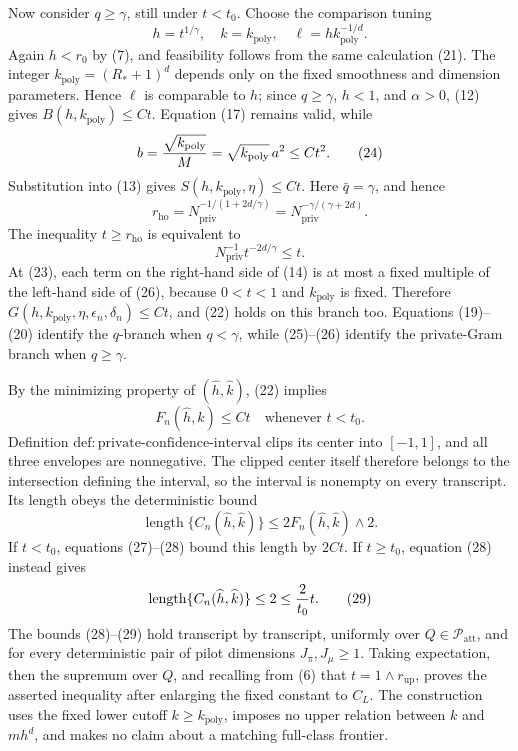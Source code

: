 Now consider \(q\ge\gamma\), still under \(t<t_0\).  Choose the comparison tuning
\[
 h=t^{1/\gamma},\quad k=k_{\mathrm{poly}},
 \quad \ell=hk_{\mathrm{poly}}^{-1/d}.
\tag{23}
\]
Again \(h<r_0\) by (7), and feasibility follows from the same calculation (21).  The integer \(k_{\mathrm{poly}}=(R_*+1)^d\) depends only on the fixed smoothness and dimension parameters.  Hence \(\ell\) is comparable to \(h\); since \(q\ge\gamma\), \(h<1\), and \(\alpha>0\), (12) gives \(B(h,k_{\mathrm{poly}})\le Ct\).  Equation (17) remains valid, while
\[
 b={\sqrt{k_{\mathrm{poly}}}\over M}
   =\sqrt{k_{\mathrm{poly}}}\,a^2\le Ct^2.
\tag{24}
\]
Substitution into (13) gives \(S(h,k_{\mathrm{poly}},\eta)\le Ct\).  Here \(\bar q=\gamma\), and hence
\[
 r_{\mathrm{ho}}
 =N_{\mathrm{priv}}^{-1/(1+2d/\gamma)}
 =N_{\mathrm{priv}}^{-\gamma/(\gamma+2d)}.
\tag{25}
\]
The inequality \(t\ge r_{\mathrm{ho}}\) is equivalent to
\[
 N_{\mathrm{priv}}^{-1}t^{-2d/\gamma}\le t.
\tag{26}
\]
At (23), each term on the right-hand side of (14) is at most a fixed multiple of the left-hand side of (26), because \(0<t<1\) and \(k_{\mathrm{poly}}\) is fixed.  Therefore \(G(h,k_{\mathrm{poly}},\eta,\epsilon_n,\delta_n)\le Ct\), and (22) holds on this branch too.  Equations (19)--(20) identify the \(q\)-branch when \(q<\gamma\), while (25)--(26) identify the private-Gram branch when \(q\ge\gamma\).

By the minimizing property of \((\widehat h,\widehat k)\), (22) implies
\[
 F_n(\widehat h,\widehat k)\le Ct
 \quad\text{whenever }t<t_0.
\tag{27}
\]
Definition \(\mathrm{def{:}private\text{-}confidence\text{-}interval}\) clips its center into \([-1,1]\), and all three envelopes are nonnegative.  The clipped center itself therefore belongs to the intersection defining the interval, so the interval is nonempty on every transcript.  Its length obeys the deterministic bound
\[
 \operatorname{length}\{C_n(\widehat h,\widehat k)\}
 \le 2F_n(\widehat h,\widehat k)\wedge2.
\tag{28}
\]
If \(t<t_0\), equations (27)--(28) bound this length by \(2Ct\).  If \(t\ge t_0\), equation (28) instead gives
\[
 \operatorname{length}\{C_n(\widehat h,\widehat k)\}
 \le2\le {2\over t_0}t.
\tag{29}
\]
The bounds (28)--(29) hold transcript by transcript, uniformly over \(Q\in\mathcal P_{\mathrm{att}}\), and for every deterministic pair of pilot dimensions \(J_\pi,J_\mu\ge1\).  Taking expectation, then the supremum over \(Q\), and recalling from (6) that \(t=1\wedge r_{\mathrm{up}}\), proves the asserted inequality after enlarging the fixed constant to \(C_L\).  The construction uses the fixed lower cutoff \(k\ge k_{\mathrm{poly}}\), imposes no upper relation between \(k\) and \(mh^d\), and makes no claim about a matching full-class frontier.
